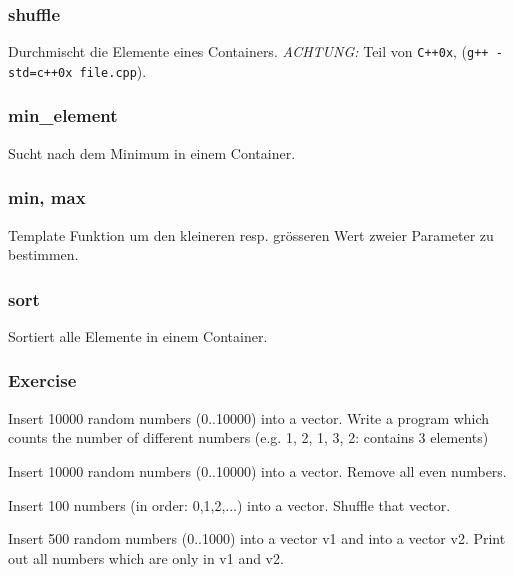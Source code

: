 \begin{frame}[fragile]
\frametitle{shuffle}
{\tiny
Durchmischt die Elemente eines Containers.
\emph{ACHTUNG:} Teil von \verb|C++0x|, (\verb|g++ -std=c++0x file.cpp|).


}
\end{frame}

\begin{frame}[fragile]
\frametitle{min\_element}
{\tiny
Sucht nach dem Minimum in einem Container.


}
\end{frame}

\begin{frame}[fragile]
\frametitle{min, max}
{\tiny
Template Funktion um den kleineren resp. grösseren Wert zweier Parameter
zu bestimmen.


}
\end{frame}

\begin{frame}[fragile]
\frametitle{sort}
{\tiny
Sortiert alle Elemente in einem Container.


}
\end{frame}

\begin{frame}[fragile]
\frametitle{Exercise}
{\tiny
\begin{exercise}
Insert 10000 random numbers (0..10000) into a vector. Write a program which counts
the number of different numbers (e.g. 1, 2, 1, 3, 2: contains 3 elements)
\end{exercise}
\begin{exercise}
Insert 10000 random numbers (0..10000) into a vector. Remove all even numbers.
\end{exercise}
\begin{exercise}
Insert 100 numbers (in order: 0,1,2,...) into a vector. Shuffle that vector.
\end{exercise}
\begin{exercise}
Insert 500 random numbers (0..1000) into a vector v1 and into a vector v2. Print
out all numbers which are only in v1 and v2.
\end{exercise}
}
\end{frame}




